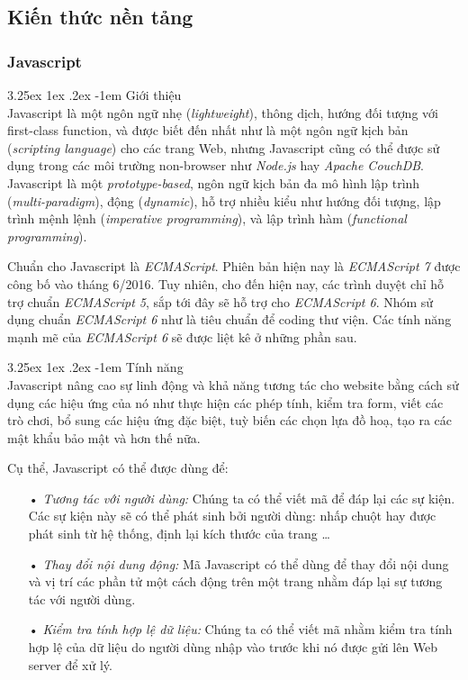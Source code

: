 \documentclass[12pt,a4paper]{article}
\makeatletter
\newcommand{\myparagraph}[1]{\paragraph{#1}\mbox{}\\} %
\renewcommand\paragraph{\@startsection{paragraph}{5}{\z@}%
  {3.25ex \@plus1ex \@minus.2ex}%
  {-1em}%
  {\normalfont\normalsize\bfseries}}
\makeatother
\begin{document}
\subsection{Kiến thức nền tảng}
\subsubsection{Javascript}
\myparagraph{Giới thiệu}
Javascript là một ngôn ngữ nhẹ (\textit{lightweight}), thông dịch, hướng đối tượng với first-class function, và được biết đến nhất như là một ngôn ngữ kịch bản (\textit{scripting language}) cho các trang Web, nhưng Javascript cũng có thể được sử dụng trong các môi trường non-browser như \textit{Node.js} hay \textit{Apache CouchDB}. Javascript là một \textit{prototype-based}, ngôn ngữ kịch bản đa mô hình lập trình (\textit{multi-paradigm}), động (\textit{dynamic}), hỗ trợ nhiều kiểu như hướng đối tượng, lập trình mệnh lệnh (\textit{imperative programming}), và lập trình hàm (\textit{functional programming}).

Chuẩn cho Javascript là \textit{ECMAScript}. Phiên bản hiện nay là \textit{ECMAScript 7} được công bố vào tháng 6/2016. Tuy nhiên, cho đến hiện nay, các trình duyệt chỉ hỗ trợ chuẩn \textit{ECMAScript 5}, sắp tới đây sẽ hỗ trợ cho \textit{ECMAScript 6}. Nhóm sử dụng chuẩn \textit{ECMAScript 6} như là tiêu chuẩn để coding thư viện. Các tính năng mạnh mẽ của \textit{ECMAScript 6} sẽ được liệt kê ở những phần sau.

\myparagraph{Tính năng}
Javascript nâng cao sự linh động và khả năng tương tác cho website bằng cách sử dụng các hiệu ứng của nó như thực hiện các phép tính, kiểm tra form, viết các trò chơi, bổ sung các hiệu ứng đặc biệt, tuỳ biến các chọn lựa đồ hoạ, tạo ra các mật khẩu bảo mật và hơn thế nữa.

Cụ thể, Javascript có thể được dùng để:
\begin{itemize}
\item[•] \emph{Tương tác với người dùng:} Chúng ta có thể viết mã để đáp lại các sự kiện. Các sự kiện này sẽ có thể phát sinh bởi người dùng: nhấp chuột hay được phát sinh từ hệ thống, định lại kích thước của trang …
\item[•] \emph{Thay đổi nội dung động:} Mã Javascript có thể dùng để thay đổi nội dung và vị trí các phần tử một cách động trên một trang nhằm đáp lại sự tương tác với người dùng.
\item[•] \emph{Kiểm tra tính hợp lệ dữ liệu:} Chúng ta có thể viết mã nhằm kiểm tra tính hợp lệ của dữ liệu do người dùng nhập vào trước khi nó được gửi lên Web server để xử lý.
\end{itemize}
\end{document}
